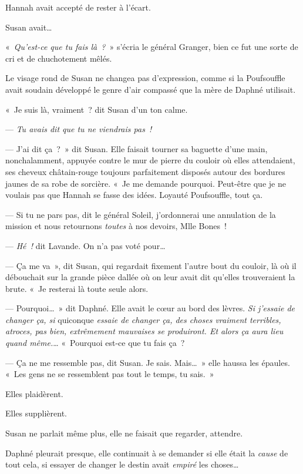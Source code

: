 Hannah avait accepté de rester à l'écart.

Susan avait…

\later

«~\emph{Qu'est-ce que tu fais là~?}~» s'écria le général Granger, bien ce fut une sorte de cri et de chuchotement mêlés.

Le visage rond de Susan ne changea pas d'expression, comme si la Poufsouffle avait soudain développé le genre d'air compassé que la mère de Daphné utilisait.

«~Je suis là, vraiment~? dit Susan d'un ton calme.

--- \emph{Tu avais dit que tu ne viendrais pas~!}

--- J'ai dit ça~?~» dit Susan. Elle faisait tourner sa baguette d'une main, nonchalamment, appuyée contre le mur de pierre du couloir où elles attendaient, ses cheveux châtain-rouge toujours parfaitement disposés autour des bordures jaunes de sa robe de sorcière. «~Je me demande pourquoi. Peut-être que je ne voulais pas que Hannah se fasse des idées. Loyauté Poufsouffle, tout ça.

--- Si tu ne pars pas, dit le général Soleil, j'ordonnerai une annulation de la mission et nous retournons \emph{toutes} à nos devoirs, Mlle Bones~!

--- \emph{Hé~!} dit Lavande. On n'a pas voté pour…

--- Ça me va~», dit Susan, qui regardait fixement l'autre bout du couloir, là où il débouchait sur la grande pièce dallée où on leur avait dit qu'elles trouveraient la brute. «~Je resterai là toute seule alors.

--- Pourquoi…~» dit Daphné. Elle avait le cœur au bord des lèvres. \emph{Si j'essaie de changer ça, si} quiconque \emph{essaie de changer ça, des choses vraiment terribles, atroces, pas bien, extrêmement mauvaises se produiront. Et alors ça aura lieu quand même.}… «~Pourquoi est-ce que tu fais ça~?

--- Ça ne me ressemble pas, dit Susan. Je sais. Mais…~» elle haussa les épaules. «~Les gens ne se ressemblent pas tout le temps, tu sais.~»

Elles plaidèrent.

Elles supplièrent.

Susan ne parlait même plus, elle ne faisait que regarder, attendre.

Daphné pleurait presque, elle continuait à se demander si elle était la \emph{cause} de tout cela, si essayer de changer le destin avait \emph{empiré} les choses…

